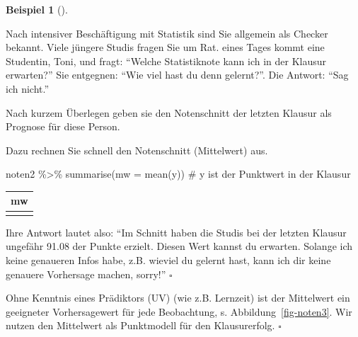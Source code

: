 \documentclass[
  letterpaper,
]{scrbook}
\newenvironment{Shaded}{\begin{snugshade}}{\end{snugshade}}
\newcommand{\AttributeTok}[1]{\textcolor[rgb]{0.40,0.45,0.13}{#1}}
\newcommand{\CommentTok}[1]{\textcolor[rgb]{0.37,0.37,0.37}{#1}}
\newcommand{\FunctionTok}[1]{\textcolor[rgb]{0.28,0.35,0.67}{#1}}
\newcommand{\NormalTok}[1]{\textcolor[rgb]{0.00,0.23,0.31}{#1}}
\newcommand{\SpecialCharTok}[1]{\textcolor[rgb]{0.37,0.37,0.37}{#1}}
\theoremstyle{definition}
\theoremstyle{definition}
\newtheorem{example}{Beispiel}[chapter]
\theoremstyle{definition}
\theoremstyle{remark}
\begin{document}
\begin{example}[]\protect\hypertarget{exm-noten-prognose}{}\label{exm-noten-prognose}

Nach intensiver Beschäftigung mit Statistik sind Sie allgemein als
Checker bekannt. Viele jüngere Studis fragen Sie um Rat. eines Tages
kommt eine Studentin, Toni, und fragt: \enquote{Welche Statistiknote
kann ich in der Klausur erwarten?} Sie entgegnen: \enquote{Wie viel hast
du denn gelernt?}. Die Antwort: \enquote{Sag ich nicht.}

Nach kurzem Überlegen geben sie den Notenschnitt der letzten Klausur als
Prognose für diese Person.

Dazu rechnen Sie schnell den Notenschnitt (Mittelwert) aus.

\begin{Shaded}
\begin{Highlighting}[]
\NormalTok{noten2 }\SpecialCharTok{\%\textgreater{}\%} 
  \FunctionTok{summarise}\NormalTok{(}\AttributeTok{mw =} \FunctionTok{mean}\NormalTok{(y))  }\CommentTok{\# y ist der Punktwert in der Klausur}
\end{Highlighting}
\end{Shaded}

\begin{longtable}[]{@{}r@{}}
\toprule\noalign{}
mw \\
\midrule\noalign{}
\endhead
\bottomrule\noalign{}
\endlastfoot
91 \\
\end{longtable}

Ihre Antwort lautet also: \enquote{Im Schnitt haben die Studis bei der
letzten Klausur ungefähr 91.08 der Punkte erzielt. Diesen Wert kannst du
erwarten. Solange ich keine genaueren Infos habe, z.B. wieviel du
gelernt hast, kann ich dir keine genauere Vorhersage machen, sorry!}
\(\square\)

\end{example}

Ohne Kenntnis eines Prädiktors (UV) (wie z.B. Lernzeit) ist der
Mittelwert ein geeigneter Vorhersagewert für jede Beobachtung, s.
Abbildung~\ref{fig-noten3}. Wir nutzen den Mittelwert als Punktmodell
für den Klausurerfolg. \(\square\)
\end{document}
